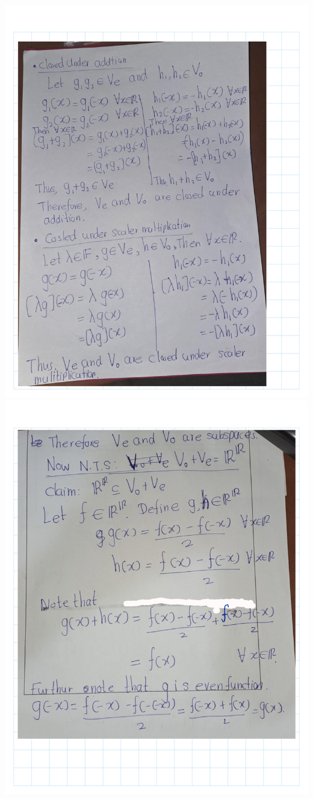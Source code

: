 \documentclass[
]{book}
\theoremstyle{definition}
\theoremstyle{definition}
\theoremstyle{definition}
\theoremstyle{definition}
\theoremstyle{remark}
\begin{document}
\begin{enumerate}
  \includegraphics{fig/Ex1C/Ex/Ex-32.png} \includegraphics{fig/Ex1C/Ex/Ex-33.png}

\end{enumerate}
\end{document}

